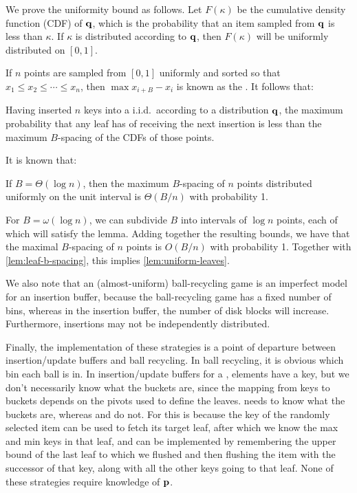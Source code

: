 We prove the uniformity bound as follows.  Let $F(\kappa)$ be the cumulative
density function (CDF) of $\mathbf{q}$, which is the probability that an item sampled
from $\mathbf{q}$ is less than $\kappa$.  If $\kappa$ is distributed according to $\mathbf{q}$,
then $F(\kappa)$ will be uniformly distributed on $[0,1]$.

If $n$ points are sampled from $[0,1]$ uniformly and sorted so that $x_1
\leq x_2 \leq \cdots \leq x_n$, then $\max{x_{i+B}-x_i}$ is known as the
. It follows that:

\begin{lemma}\label{lem:leaf-b-spacing}
	Having inserted $n$ keys into a \btree{} i.i.d.\ according to a distribution
	$\mathbf{q}$, the maximum probability that any leaf has of receiving the next
	insertion is less than the maximum $B$-spacing of the CDFs of those points.
\end{lemma}

It is known that:

\begin{lemma}
	If $B = \Theta(\log{n})$, then the maximum $B$-spacing of $n$ points
	distributed uniformly on the unit interval is $\Theta(B/n)$ with
	probability 1.
\end{lemma}

For $B = \omega(\log{n})$, we can subdivide $B$ into intervals of $\log{n}$
points, each of which will satisfy the lemma. Adding together the resulting
bounds, we have that the maximal $B$-spacing of $n$ points is $O(B/n)$ with
probability 1. Together with \cref{lem:leaf-b-spacing}, this implies
\cref{lem:uniform-leaves}.

We also note that an (almost-uniform) ball-recycling game is an imperfect model
for an insertion buffer, because the ball-recycling game has a fixed number of
bins, whereas in the insertion buffer, the number of disk blocks will increase.
Furthermore, insertions may not be independently distributed.

Finally, the implementation of these strategies is a point of departure between
insertion/update buffers and ball recycling.  In ball recycling, it is obvious
which bin each ball is in.  In insertion/update buffers for a \btree{},
elements have a key, but we don't necessarily know what the buckets are, since
the mapping from keys to buckets depends on the pivots used to define the
\btree{} leaves.  \FB needs to know what the buckets are, whereas \RB and \GG
do not.  For \RB this is because the key of the randomly selected item can be
used to fetch its target \btree{} leaf, after which we know the max and min
keys in that leaf, and \GG can be implemented by remembering the upper bound of
the last leaf to which we flushed and then flushing the item with the successor
of that key, along with all the other keys going to that leaf.  None of these
strategies require knowledge of $\mathbf{p}$. 

